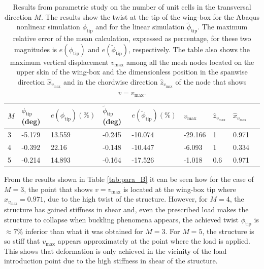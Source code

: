     \begin{table}[!htpb] %
      \centering
      \begin{tabular}{|l|l|l|l|l|l|l|l|l|}
      \hline
      $M$ & $\phi_{\mathrm{tip}}$ (deg) & $e(\phi_{\mathrm{tip}}) (\%)$ & $\tilde{\phi}_{\mathrm{tip}}$ (deg) & $e(\tilde{\phi}_{\mathrm{tip}}) (\%)$ & $v_{\mathrm{max}}$ & $\hat{z}_{v_{\mathrm{max}}}$ & $\hat{x}_{v_{\mathrm{max}}}$ \\ \hline
      3 & -5.179 & 13.559 & -0.245 & -10.074 & -29.166 & 1 & 0.971 \\ \hline
      4 & -0.392 & 22.16 & -0.148 & -10.447 & -6.093 & 1 & 0.334 \\ \hline
      5 & -0.214 & 14.893 & -0.164 & -17.526 & -1.018 & 0.6 & 0.971 \\ \hline
      \end{tabular}
      \caption[Results from parametric study on the number of unit cells in the transversal direction]{Results from parametric study on the number of unit cells in the transversal direction $M$. The results show the twist at the tip of the wing-box for the Abaqus nonlinear simulation $\phi_{\mathrm{tip}}$ and for the linear simulation $\tilde{\phi}_{\mathrm{tip}}$. The maximum relative error of the mean calculation, expressed as percentage, for these two magnitudes is $e(\phi_{\mathrm{tip}})$ and $e(\tilde{\phi}_{\mathrm{tip}})$, respectively. The table also shows the maximum vertical displacement $v_{\mathrm{max}}$ among all the mesh nodes located on the upper skin of the wing-box and the dimensionless position in the spanwise direction $\hat{x}_{v_{\mathrm{max}}}$ and in the chordwise direction $\hat{z}_{v_{\mathrm{max}}}$ of the node that shows $v = v_{\mathrm{max}}$.}
      \label{tab:para_M}
    \end{table}

    From the results shown in Table \ref{tab:para_B} it can be seen how for the case of $M = 3$, the point that shows $v = v_{\mathrm{max}}$ is located at the wing-box tip where $\hat{x}_{v_{\mathrm{max}}} = 0.971$, due to the high twist of the structure. However, for $M = 4$, the structure has gained stiffness in shear and, even the prescribed load makes the structure to collapse when buckling phenomena appears, the achieved twist $\phi_{\mathrm{tip}}$ is $\approx 7\%$ inferior than what it was obtained for $M = 3$. For $M = 5$, the structure is so stiff that $v_{\mathrm{max}}$ appears approximately at the point where the load is applied. This shows that deformation is only achieved in the vicinity of the load introduction point due to the high stiffness in shear of the structure. 

